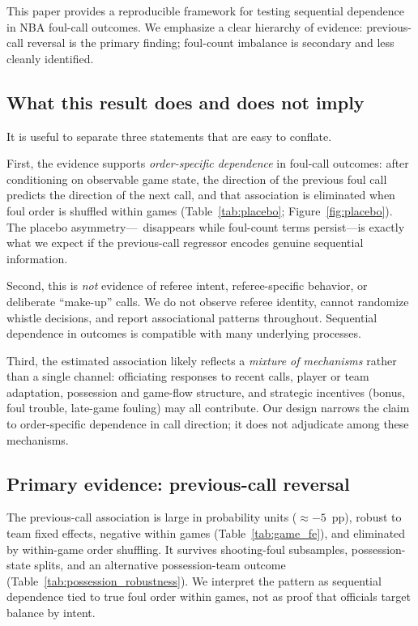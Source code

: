 \label{sec:discussion}

This paper provides a reproducible framework for testing sequential dependence in NBA foul-call outcomes. We emphasize a clear hierarchy of evidence: previous-call reversal is the primary finding; foul-count imbalance is secondary and less cleanly identified.

\subsection{What this result does and does not imply}
\label{sec:discussion:implications}

It is useful to separate three statements that are easy to conflate.

First, the evidence supports \emph{order-specific dependence} in foul-call outcomes: after conditioning on observable game state, the direction of the previous foul call predicts the direction of the next call, and that association is eliminated when foul order is shuffled within games (Table~\ref{tab:placebo}; Figure~\ref{fig:placebo}). The placebo asymmetry---\foullast\ disappears while foul-count terms persist---is exactly what we expect if the previous-call regressor encodes genuine sequential information.

Second, this is \emph{not} evidence of referee intent, referee-specific behavior, or deliberate ``make-up'' calls. We do not observe referee identity, cannot randomize whistle decisions, and report associational patterns throughout. Sequential dependence in outcomes is compatible with many underlying processes.

Third, the estimated association likely reflects a \emph{mixture of mechanisms} rather than a single channel: officiating responses to recent calls, player or team adaptation, possession and game-flow structure, and strategic incentives (bonus, foul trouble, late-game fouling) may all contribute. Our design narrows the claim to order-specific dependence in call direction; it does not adjudicate among these mechanisms.

\subsection{Primary evidence: previous-call reversal}

The previous-call association is large in probability units ($\approx -5$~pp), robust to team fixed effects, negative within games (Table~\ref{tab:game_fe}), and eliminated by within-game order shuffling. It survives shooting-foul subsamples, possession-state splits, and an alternative possession-team outcome (Table~\ref{tab:possession_robustness}). We interpret the pattern as sequential dependence tied to true foul order within games, not as proof that officials target balance by intent.

